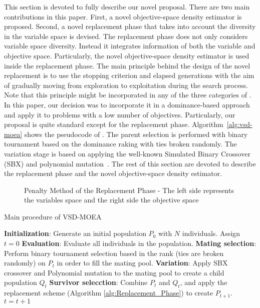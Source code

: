 This section is devoted to fully describe our novel proposal.
%
There are two main contributions in this paper.
%
First, a novel objective-space density estimator is proposed.
%
Second, a novel replacement phase that takes into account the diversity in the variable space is devised.
%
The replacement phase does not only considers variable space diversity.
%
Instead it integrates information of both the variable and objective space.
%
Particularly, the novel objective-space density estimator is used inside the replacement phase.
%
The main principle behind the design of the novel replacement is to use the stopping criterion and 
elapsed generations with the aim of gradually moving from exploration to exploitation during the search process.
%
Note that this principle might be incorporated in any of the three categories of \MOEAS{}.
%
In this paper, our decision was to incorporate it in a dominance-based approach and apply it to problems with 
a low number of objectives.
%
Particularly, our proposal is quite standard except for the replacement phase.
%
Algorithm~\ref{alg:vsd-moea} shows the pseudocode of \VSDMOEA{}.
%
The parent selection is performed with binary tournament based on the dominance raking with ties broken randomly.
%
The variation stage is based on applying the well-known Simulated Binary Crossover (SBX) 
and polynomial mutation~\cite{Joel:SBX1994, Joel:Mutation}.
%
The rest of this section are devoted to describe the replacement phase and the novel objective-space density 
estimator.

\begin{figure}[t]
\centering

\caption{Penalty Method of the Replacement Phase - The left side represents the variables space and the right side the 
objective space} \label{fig:Hypersphere}
\end{figure}

\begin{algorithm}[t]
  \scriptsize
	\caption{Main procedure of VSD-MOEA} 
\begin{algorithmic}[1]
 	\STATE \textbf{Initialization}: Generate an initial population $P_0$ with $N$ individuals.
	\STATE Assign $t=0$
	   \STATE \textbf{Evaluation}: Evaluate all individuals in the population.
	   \STATE \textbf{Mating selection}: Perform binary tournament selection based in the rank (ties are broken randomly) on $P_t$ in order to fill the mating pool.
	   \STATE \textbf{Variation}: Apply SBX crossover and Polynomial mutation to the mating pool to create a child population $Q_t$
	   \STATE \textbf{Survivor selecction}: Combine $P_t$ and $Q_t$, and apply the replacement scheme (Algorithm \ref{alg:Replacement_Phase}) to create $P_{t+1}$.
	   \STATE $t=t+1$
	\ENDWHILE
	\end{algorithmic}
\label{alg:vsd-moea}
\end{algorithm}




